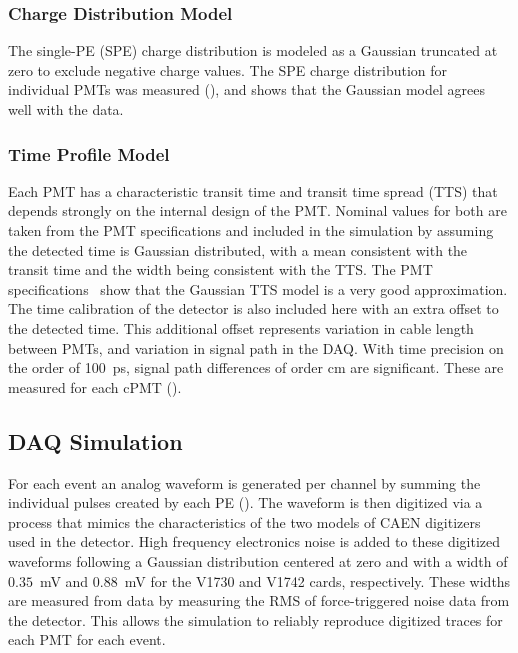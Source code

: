 \subsubsection{Charge Distribution Model}

The single-PE (SPE) charge distribution is modeled as a Gaussian truncated at zero to exclude negative charge values. 
The SPE charge distribution for individual PMTs was measured (), and  shows that the Gaussian model agrees well with the data.


\subsubsection{Time Profile Model}

Each PMT has a characteristic transit time and transit time spread (TTS) that depends strongly on the internal design of the PMT. 
Nominal values for both are taken from the PMT specifications and included in the simulation by assuming the detected time is Gaussian distributed, with a mean consistent with the transit time and the width being consistent with the TTS. 
The PMT specifications~\cite{h11934} show that the Gaussian TTS model is a very good approximation.
The time calibration of the detector is also included here with an extra offset to the detected time.
This additional offset represents variation in cable length between PMTs, and variation in signal path in the DAQ.
With time precision on the order of 100~ps, signal path differences of order cm are significant.
These are measured for each cPMT ().



\subsection{DAQ Simulation \label{sec:daq_sim}}


For each event an analog waveform is generated per channel by summing the individual pulses created by each PE (). 
The waveform is then digitized via a process that mimics the characteristics of the two models of CAEN digitizers used in the detector. 
High frequency electronics noise is added to these digitized waveforms following a Gaussian distribution centered at zero and with a width of $0.35$~mV and $0.88$~mV for the V1730 and V1742 cards, respectively.
These widths are measured from data by measuring the RMS of force-triggered noise data from the detector.
This allows the simulation to reliably reproduce digitized traces for each PMT for each event.

